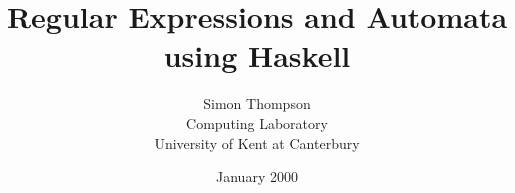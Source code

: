 \documentclass[11pt]{article}
\begin{document}
%
\newcommand{\bs}{$\tt\backslash\!\!$}
\newcommand{\lbs}{\mbox{\verb+\+}}
\newcommand{\ignore}[1]{}
\newcommand{\bl}{\mbox{\ }}
\newcommand{\gi}{\mbox{$\tt g_i$}}
\newcommand{\ei}{\mbox{$\tt e_i$}}
\newcommand{\aone}{\mbox{$\tt a_1$}}
\newcommand{\atwo}{\mbox{$\tt a_2$}}
\newcommand{\ak}{\mbox{$\tt a_k$}}
\newcommand{\pone}{\mbox{$\tt p_1$}}
\newcommand{\ptwo}{\mbox{$\tt p_2$}}
\newcommand{\pk}{\mbox{$\tt p_k$}}
\newcommand{\eone}{\mbox{$\tt e_1$}}
\newcommand{\etwo}{\mbox{$\tt e_2$}}
\newcommand{\er}{\mbox{$\tt e_r$}}
\newcommand{\gone}{\mbox{$\tt g_1$}}
\newcommand{\gtwo}{\mbox{$\tt g_2$}}
\newcommand{\gr}{\mbox{$\tt g_r$}}
\newcommand{\qone}{\mbox{$\tt q_1$}}
\newcommand{\qtwo}{\mbox{$\tt q_2$}}
\newcommand{\qk}{\mbox{$\tt q_k$}}
\newcommand{\fone}{\mbox{$\tt f_1$}}
\newcommand{\fl}{\mbox{$\tt f_l$}}
\newcommand{\hone}{\mbox{$\tt h_1$}}
\newcommand{\hl}{\mbox{$\tt h_l$}}
\newcommand{\vone}{\mbox{$\tt v_1$}}
\newcommand{\aoneone}{\mbox{$\tt a_{1,1}$}}
\newcommand{\stone}{\mbox{$\tt st_1$}}
\newcommand{\sttwo}{\mbox{$\tt st_2$}}
\newcommand{\stn}{\mbox{$\tt st_n$}}
\newcommand{\rone}{\mbox{$\tt r_1$}}
\newcommand{\rtwo}{\mbox{$\tt r_2$}}
\newcommand{\rthree}{\mbox{$\tt r_3$}}
\newcommand{\beware}[1]
 {\medskip\noindent\framebox{\parbox{\textwidth}{$\cal N.B.$
    #1}}\medskip\noindent}
\newcommand{\eps}{$\varepsilon$}
\newcommand{\trans}[1]{\stackrel{\mbox{\tt #1}}{\longrightarrow}}




\title{Regular Expressions and Automata\\
using Haskell}
\author{Simon Thompson\\
Computing Laboratory\\
University of Kent at Canterbury}
\date{January 2000}
\maketitle

\ignore{
\begin{figure}[b]
\footnoterule
\copyright\ Simon Thompson, 2000
\end{figure}
}
\end{document}

